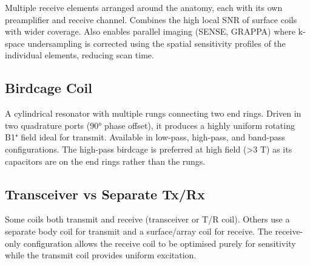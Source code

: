 Multiple receive elements arranged around the anatomy, each with its own preamplifier and receive channel. Combines the high local SNR of surface coils with wider coverage. Also enables parallel imaging (SENSE, GRAPPA) where k-space undersampling is corrected using the spatial sensitivity profiles of the individual elements, reducing scan time.

				

\subsection{Birdcage Coil}

				

A cylindrical resonator with multiple rungs connecting two end rings. Driven in two quadrature ports (90° phase offset), it produces a highly uniform rotating B1⁺ field ideal for transmit. Available in low-pass, high-pass, and band-pass configurations. The high-pass birdcage is preferred at high field (\textgreater{}3 T) as its capacitors are on the end rings rather than the rungs.

				

\subsection{Transceiver vs Separate Tx/Rx}

				

Some coils both transmit and receive (transceiver or T/R coil). Others use a separate body coil for transmit and a surface/array coil for receive. The receive-only configuration allows the receive coil to be optimised purely for sensitivity while the transmit coil provides uniform excitation.



